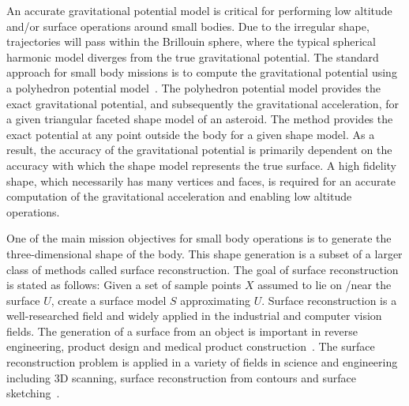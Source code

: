 An accurate gravitational potential model is critical for performing low altitude and/or surface operations around small bodies.
Due to the irregular shape, trajectories will pass within the Brillouin sphere, where the typical spherical harmonic model diverges from the true gravitational potential.
The standard approach for small body missions is to compute the gravitational potential using a polyhedron potential model~\cite{werner1996}.
The polyhedron potential model provides the exact gravitational potential, and subsequently the gravitational acceleration, for a given triangular faceted shape model of an asteroid.
The method provides the exact potential at any point outside the body for a given shape model.
As a result, the accuracy of the gravitational potential is primarily dependent on the accuracy with which the shape model represents the true surface.
A high fidelity shape, which necessarily has many vertices and faces, is required for an accurate computation of the gravitational acceleration and enabling low altitude operations.

One of the main mission objectives for small body operations is to generate the three-dimensional shape of the body.
This shape generation is a subset of a larger class of methods called surface reconstruction.
The goal of surface reconstruction is stated as follows: Given a set of sample points \( X\) assumed to lie on /near the surface \( U \), create a surface model \( S \) approximating \( U \).
Surface reconstruction is a well-researched field and widely applied in the industrial and computer vision fields.
The generation of a surface from an object is important in reverse engineering, product design and medical product construction~\cite{amenta2001}.
The surface reconstruction problem is applied in a variety of fields in science and engineering including 3D scanning, surface reconstruction from contours and surface sketching~\cite{hoppe1992}.

